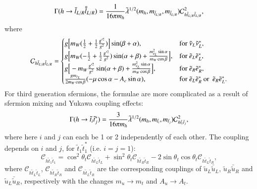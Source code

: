 \documentclass[final,3p,times,pdflatex]{elsarticle}
\begin{document}
\begin{equation} \label{hlLRlLR}
\Gamma(h \rightarrow \tilde{l}_{L/R} \bar{\tilde{l}}_{L/R}) = {1 \over 16 \pi m_{h}}\tilde{\lambda}^{1/2}(m_h,m_{\tilde{l}_{L/R}}, m_{\tilde{l}_{L/R}}) \mathcal{C}_{h \tilde{l}_{L/R} \tilde{l}_{L/R}}^2,
\end{equation}
where
\begin{equation}
\mathcal{C}_{h \tilde{l}_{L/R} \tilde{l}_{L/R}} = \begin{cases}
			g\Big[m_{W}({1 \over 2}+{1 \over 2}{g'^2 \over g^2})\Big]\sin(\beta+\alpha), &$for $ \tilde{\nu}_L {\tilde{\nu}}_L^*, \\
			g\Big[m_{W}(-{1 \over 2}+{1 \over 2}{g'^2 \over g^2})\sin(\alpha+\beta) + {m_{\tilde{e}_L}^2 \sin\alpha \over m_{W} \cos\beta}\Big], &$for $ \tilde{e}_L \tilde{{e}}_L^*, \\
			g\Big[-m_{W}{g'^2 \over g^2}\sin(\alpha+\beta) + {m_{\tilde{e}_{L}}^2\sin\alpha \over m_{W} \cos\beta}\Big], &$for $ \tilde{e}_R {\tilde{e}}_R^*, \\
			{g m_{\tilde{e}_L} \over 2 m_{W} \cos \beta} (-\mu \cos \alpha - A_{e}\sin\alpha), &$for $ \tilde{e}_L {\tilde{e}}_R^* \: $or $\: \tilde{e}_R {\tilde{e}}_L^*. \\
			\end{cases}
\end{equation}
For third generation sfermions, the formulae are more complicated as a result of sfermion mixing and Yukawa coupling effects:
\begin{equation} \label{hstst}
\Gamma(h \rightarrow \tilde{t}_{i} \tilde{t}_{j}^*) = {3 \over 16 \pi m_{h}} \tilde{\lambda}^{1/2}(m_h,m_{\tilde{t}_i}, m_{\tilde{t}_j}) \mathcal{C}_{h \tilde{t}_{i} \tilde{t}_{j}}^2,
\end{equation}
where here $i$ and $j$ can each be 1 or 2 independently of each other. The coupling depends on $i$ and $j$, for $\tilde{t}_1 {\tilde{t}}_1^*$ (i.e. $i=j=1$):
\begin{equation}
\mathcal{C}_{h \tilde{t}_{1} \tilde{t}_{1}} = \cos^2 \theta_t \mathcal{C}_{h \tilde{t}_{L} \tilde{t}_{L}} + \sin^2 \theta_t \mathcal{C}_{h \tilde{t}_{R} \tilde{t}_{R}} - 2\sin\theta_t \cos\theta_t \mathcal{C}_{h \tilde{t}_{L} \tilde{t}_{R}},
\end{equation}
where $\mathcal{C}_{h \tilde{t}_{L}\tilde{t}_{L}}$, $\mathcal{C}_{h \tilde{t}_{R} \tilde{t}_{R}}$ and $\mathcal{C}_{h \tilde{t}_{L} \tilde{t}_{R}}$ are the corresponding couplings of $\tilde{u}_L \bar{\tilde{u}}_L$, $\tilde{u}_R \bar{\tilde{u}}_R$ and $\tilde{u}_L \bar{\tilde{u}}_R$, respectively with the changes $m_u \rightarrow m_t$ and $A_u \rightarrow A_t$.
\end{document}
